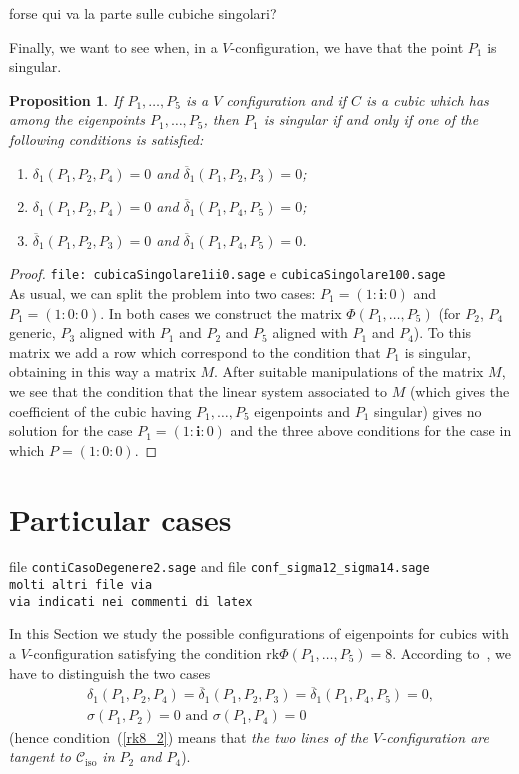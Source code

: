 \documentclass[11pt, a4paper, reqno, captions=tableheading,bibliography=totoc]{scrartcl}
\theoremstyle{plain}
\newtheorem{prop}[lemma]{Proposition}
\theoremstyle{definition}
\newcommand{\iso}{\mathcal{C}_{\mathrm{iso}}}
\newcommand{\iii}{\textbf{i}}
\newcommand{\rk}{\ensuremath{\mathrm{rk}}}
\begin{document}
forse qui va la parte sulle cubiche singolari?

Finally, we want to see when, in a $V$-configuration, we have that the point
$P_1$ is singular.

\begin{prop}
\label{proposition:P1_sing}
If $P_1, \dots, P_5$ is a $V$ configuration and if $C$ is a cubic which
has among the eigenpoints $P_1, \dots, P_5$, then $P_1$ is singular if
and only if one of the following conditions is satisfied:
\begin{enumerate}
\item $\delta_1(P_1, P_2, P_4) = 0$ and $\overline{\delta}_1(P_1, P_2, P_3) = 0$;
\item $\delta_1(P_1, P_2, P_4) = 0$ and $\overline{\delta}_1(P_1, P_4, P_5) = 0$;
\item $\overline{\delta}_1(P_1, P_2, P_3) = 0$ and
$\overline{\delta}_1(P_1, P_4, P_5) = 0$.
\end{enumerate}
\end{prop}
\begin{proof}
\verb+file: cubicaSingolare1ii0.sage+ e \verb+cubicaSingolare100.sage+\\
As usual, we can split the problem into two cases: $P_1 = (1: \iii: 0)$
and $P_1 = (1: 0: 0)$. In both cases we construct the matrix
$\Phi(P_1, \dots, P_5)$ (for $P_2$, $P_4$ generic, $P_3$ aligned with
$P_1$ and $P_2$ and $P_5$ aligned with $P_1$ and $P_4$). To this matrix we add
a row which correspond to the condition that $P_1$ is singular, obtaining
in this way a matrix $M$. After
suitable manipulations of the matrix $M$, we see that the condition that
the linear system associated to $M$ (which gives the coefficient of the cubic
having $P_1, \dots, P_5$ eigenpoints and $P_1$ singular) gives no solution
for the case $P_1=(1: \iii: 0)$ and the three above conditions for the
case in which $P = (1: 0: 0)$.
\end{proof}



\section{Particular cases}
file \verb+contiCasoDegenere2.sage+ and file
\verb+conf_sigma12_sigma14.sage+\\
\verb+molti altri file via +\\
\verb+via indicati nei commenti di latex+

In this Section we study the possible configurations of
eigenpoints for cubics with a $V$-configuration
satisfying the condition $\rk \Phi(P_1, \dots, P_5) = 8$. According
to~, we have to distinguish the two cases
\begin{eqnarray}
\delta_1(P_1, P_2, P_4)=\overline{\delta}_1(P_1, P_2, P_3) =
\overline{\delta}_1(P_1, P_4, P_5) = 0,
\label{rk8_1}\\
\sigma(P_1, P_2) = 0 \mbox{ and } \sigma(P_1, P_4) = 0
\label{rk8_2}
\end{eqnarray}
(hence condition~(\ref{rk8_2}) means that \emph{the two lines of
the $V$-configuration are tangent to $\iso$ in $P_2$ and $P_4$}).
\end{document}
